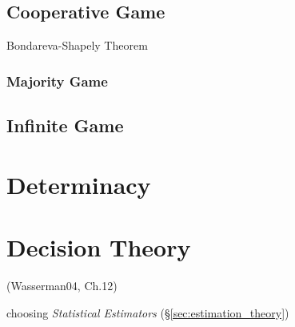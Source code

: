 \subsection{Cooperative Game}\label{sec:cooperative_game}

Bondareva-Shapely Theorem



\subsubsection{Majority Game}\label{sec:majority_game}



\subsection{Infinite Game}\label{sec:infinite_game}



\section{Determinacy}\label{sec:determinacy}

\section{Decision Theory}\label{sec:decision_theory}

(Wasserman04, Ch.12)

choosing \emph{Statistical Estimators} (\S\ref{sec:estimation_theory})

